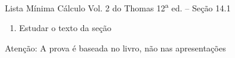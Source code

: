 \documentclass[fleqn,utf8,aspectratio=169,12pt,ignorenonframetext]{beamer}
\begin{document}
\begin{frame}{Lista Mínima}
  Cálculo Vol. 2 do Thomas 12\textsuperscript{a} ed. -- Seção 14.1
  \begin{enumerate}
    \item Estudar o texto da seção
  \end{enumerate}

  \vfill
  Atenção: A prova é baseada no livro, não nas apresentações
\end{frame}

\end{document}
